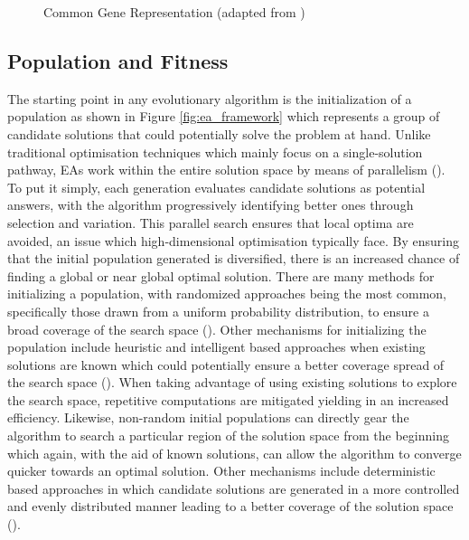 \parbreak
\begin{figure}[h!] %
	\centering %
	\caption{Common Gene Representation (adapted from \cite{intelligentOptimization})}
	\label{fig:ea_representations} %
\end{figure}

\subsection{Population and Fitness}
The starting point in any evolutionary algorithm is the initialization of a population as shown in Figure \ref{fig:ea_framework} which represents a group of candidate solutions that could potentially solve the problem at hand. Unlike traditional optimisation techniques which mainly focus on a single-solution pathway, EAs work within the entire solution space by means of parallelism (\cite{okramergeneticalgorithms}). To put it simply, each generation evaluates candidate solutions as potential answers, with the algorithm progressively identifying better ones through selection and variation. This parallel search ensures that local optima are avoided, an issue which high-dimensional optimisation typically face. By ensuring that the initial population generated is diversified, there is an increased chance of finding a global or near global optimal solution. There are many methods for initializing a population, with randomized approaches being the most common, specifically those drawn from a uniform probability distribution, to ensure a broad coverage of the search space (\cite{initialPopulation}). Other mechanisms for initializing the population include heuristic and intelligent based approaches when existing solutions are known which could potentially ensure a better coverage spread of the search space (\cite{initialPopulation}). When taking advantage of using existing solutions to explore the search space, repetitive computations are mitigated yielding in an increased efficiency. Likewise, non-random initial populations can directly gear the algorithm to search a particular region of the solution space from the beginning which again, with the aid of known solutions, can allow the algorithm to converge quicker towards an optimal solution. Other mechanisms include deterministic based approaches in which candidate solutions are generated in a more controlled and evenly distributed manner leading to a better coverage of the solution space (\cite{THARWAT2021100952}).

